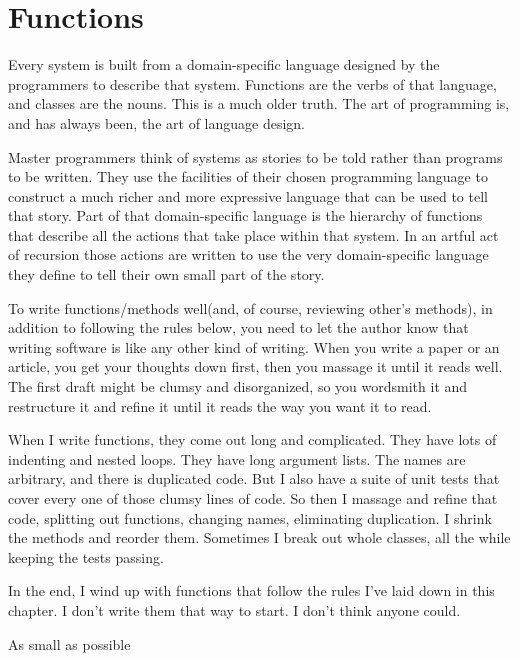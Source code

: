 
\chapter{Functions}

Every system is built from a domain-specific language designed by the programmers to describe that system. Functions are the verbs of that language, and classes are the nouns. This is a much older truth. The art of programming is, and has always been, the art of language design.

Master programmers think of systems as stories to be told rather than programs to be written. They use the facilities of their chosen programming language to construct a much richer and more expressive language that can be used to tell that story. Part of that domain-specific language is the hierarchy of functions that describe all the actions that take place within that system. In an artful act of recursion those actions are written to use the very domain-specific language they define to tell their own small part of the story.

To write functions/methods well(and, of course, reviewing other's methods), in addition to following the rules below, you need to let the author know that writing software is like any other kind of writing. When you write a paper or an article,
you get your thoughts down first, then you massage it until it reads well. The first draft might be clumsy and disorganized, so you wordsmith it and restructure it and refine it until it reads the way you want it to read.

When I write functions, they come out long and complicated. They have lots of
indenting and nested loops. They have long argument lists. The names are arbitrary, and there is duplicated code. But I also have a suite of unit tests that cover every one of those clumsy lines of code. So then I massage and refine that code, splitting out functions, changing names, eliminating duplication. I shrink the methods and reorder them. Sometimes I break out whole classes, all the while keeping the tests passing.

In the end, I wind up with functions that follow the rules I've laid down in this chapter. I don't write them that way to start. I don't think anyone could.

\begin{tcolorbox}[breakable, colback=green!10!white, colframe=green!85!black, center title, title = Golden Rule of Functions]
\begin{center}
As small as possible
\end{center}
\end{tcolorbox}

